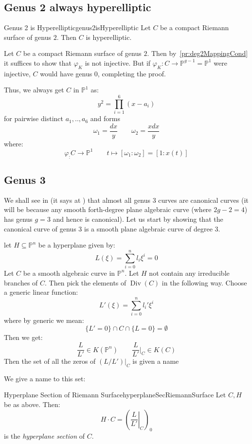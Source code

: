 \documentclass{book}
\renewcommand{\P}{{\mathbb{P}}}
\newcommand{\Div}{{\operatorname{Div}}}
\newcommand{\sse}{\subseteq}
\let\temp\phi
\let\phi\varphi
\let\varphi\temp
\begin{document}
\subsection{Genus 2 always hyperelliptic}

\begin{prop}{Genus 2 is Hyperelliptic}{genus2isHyperelliptic}
  Let $C$ be a compact Riemann surface of genus $2$. Then $C$ is hyperelliptic.
\end{prop}

\begin{Proof}
  Let $C$ be a compact Riemann surface of genus $2$. Then by~\cref{pr:deg2MappingCond} it suffices to show
  that $\phi_K$ is not injective. But if $\phi_K: C \to \P^{g-1}=\P^1$ were injective, $C$ would have genus $0$,
  completing the proof.
\end{Proof}

Thus, we always get $C$ in $\P^1$ as:
\[
  y^2 = \prod_{i=1}^6 (x-a_i)
\]
for pairwise distinct $a_1, .., a_6$ and forms
\[
  \omega_1 = \frac{dx}{y} \qquad \omega_2 = \frac{xdx}{y}
\]
where:
\[
  \phi_: C \to \P^1 \qquad t \mapsto [\omega_1: \omega_2] = [1: x(t)]
\]

\subsection{Genus 3}

We shall see in (it says at \cite[p.212]{a.griffithsIntroductionAlgebraicCurves}) that almost all genus 3
curves are canonical curves (it will be because any smooth forth-degree plane algebraic curve (where $2g-2=4$)
has genus $g= 3$ and hence is canonical). Let us start by showing that the canonical curve of genus $3$ is a smooth plane
algebraic curve of degree $3$.

let $H\sse \P^n$ be a hyperplane given by:
\[
  L(\xi) = \sum_{i=0}^n l_i\xi^i = 0
\]
Let $C$ be a smooth algebraic curve in $\P^n$. Let $H$ not contain any irreducible branches of $C$.  Then pick
the elements of $\Div(C)$ in the following way. Choose a generic linear function:
\[
  L'(\xi) = \sum_{i=0}^n l_i' \xi^i
\]
where by generic we mean:
\[
  \{L' = 0\} \cap C \cap \{L=0\} = \emptyset
\]
Then we get:
\[
  \frac{L}{L'} \in K(\P^n) \qquad \frac{L}{L'}|_C \in K(C)
\]
Then the set of all the zeros of $(L/L')|_C$ is given a name


We give a name to this set:

\begin{defn}{Hyperplane Section of Riemann Surface}{hyperplaneSecRiemannSurface}
  Let $C,H$ be as above. Then:
  \[
    H\cdot C = \left( \left.\frac{L}{L'}\right|_C\right)_0
  \]
  is the \emph{hyperplane section} of $C$.
\end{defn}
\end{document}
